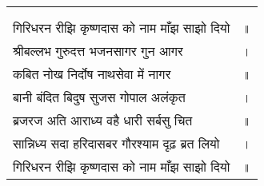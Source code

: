 {
{\bfseries
\setlength{\mylenone}{0pt}
\settowidth{\mylentwo}{}
\setlength{\mylenone}{\maxof{\mylenone}{\mylentwo}}
\settowidth{\mylentwo}{गिरिधरन रीझि कृष्णदास को नाम माँझ साझो दियो}
\setlength{\mylenone}{\maxof{\mylenone}{\mylentwo}}
\settowidth{\mylentwo}{श्रीबल्लभ गुरुदत्त भजनसागर गुन आगर}
\setlength{\mylenone}{\maxof{\mylenone}{\mylentwo}}
\settowidth{\mylentwo}{कबित नोख निर्दोष नाथसेवा में नागर}
\setlength{\mylenone}{\maxof{\mylenone}{\mylentwo}}
\settowidth{\mylentwo}{बानी बंदित बिदुष सुजस गोपाल अलंकृत}
\setlength{\mylenone}{\maxof{\mylenone}{\mylentwo}}
\settowidth{\mylentwo}{ब्रजरज अति आराध्य वहै धारी सर्बसु चित}
\setlength{\mylenone}{\maxof{\mylenone}{\mylentwo}}
\settowidth{\mylentwo}{सान्निध्य सदा हरिदासबर गौरश्याम दृढ़ ब्रत लियो}
\setlength{\mylenone}{\maxof{\mylenone}{\mylentwo}}
\settowidth{\mylentwo}{गिरिधरन रीझि कृष्णदास को नाम माँझ साझो दियो}
\setlength{\mylenone}{\maxof{\mylenone}{\mylentwo}}
\setlength{\mylentwo}{\baselineskip}
\setlength{\mylenone}{\mylenone + 1pt}
\begin{longtable}[l]{@{\hspace*{\mylen}}>{\setlength\parfillskip{0pt}}p{\mylenone}@{}@{}l@{}}
 & \\[-\the\mylentwo]
\centering{॥ ८१ \hspace*{-1.5mm}॥} & \\ \nopagebreak
गिरिधरन रीझि कृष्णदास को नाम माँझ साझो दियो & ॥\\
श्रीबल्लभ गुरुदत्त भजनसागर गुन आगर & ।\\ \nopagebreak
कबित नोख निर्दोष नाथसेवा में नागर & ॥\\
बानी बंदित बिदुष सुजस गोपाल अलंकृत & ।\\ \nopagebreak
ब्रजरज अति आराध्य वहै धारी सर्बसु चित & ॥\\
सान्निध्य सदा हरिदासबर गौरश्याम दृढ़ ब्रत लियो & ।\\ \nopagebreak
गिरिधरन रीझि कृष्णदास को नाम माँझ साझो दियो & ॥
\end{longtable}
}
}
